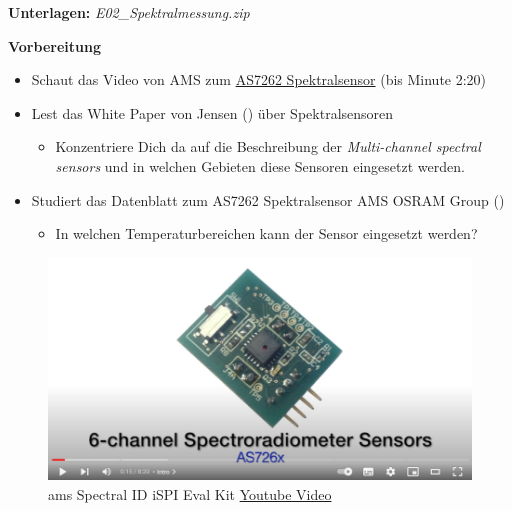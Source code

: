 \documentclass[
  11pt,
  a4paperpaper,
  oneside, openany  ,captions=tableheading
]{scrbook}
\providecommand{\tightlist}{%
  \setlength{\itemsep}{0pt}\setlength{\parskip}{0pt}}
\theoremstyle{definition}
\theoremstyle{remark}
\begin{document}
\textbf{Unterlagen:} \emph{ E02\_Spektralmessung.zip}

\textbf{Vorbereitung}

\begin{itemize}
\tightlist
\item
  Schaut das Video von AMS zum
  \href{https://www.youtube.com/embed/KKyHxXyaVPM?si=hvO1IVbdwbjnDI40}{AS7262
  Spektralsensor} (bis Minute 2:20)
\item
  Lest das White Paper von Jensen () über
  Spektralsensoren

  \begin{itemize}
  \tightlist
  \item
    Konzentriere Dich da auf die Beschreibung der \emph{Multi-channel
    spectral sensors} und in welchen Gebieten diese Sensoren eingesetzt
    werden.
  \end{itemize}
\item
  Studiert das Datenblatt zum AS7262 Spektralsensor AMS OSRAM Group
  ()

  \begin{itemize}
  \tightlist
  \item
    In welchen Temperaturbereichen kann der Sensor eingesetzt werden?
  \end{itemize}
\end{itemize}

\begin{figure}[H]

{\centering \includegraphics{images/youtube_ams_as7262.png}

}

\caption{ams Spectral ID iSPI Eval Kit
\href{https://www.youtube.com/embed/4vdliMRtxBY}{Youtube Video}}

\end{figure}%
\end{document}
